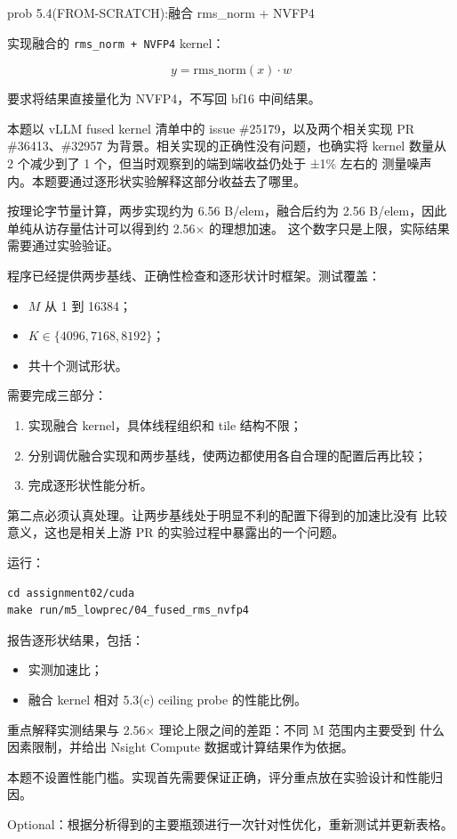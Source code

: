 \documentclass[11pt,a4paper,fontset=fandol]{ctexart}
\providecommand{\tightlist}{\setlength{\itemsep}{0pt}\setlength{\parskip}{0pt}}
\begin{document}
\begin{capstone}{prob 5.4(FROM-SCRATCH):融合 rms\_norm + NVFP4}

实现融合的 \texttt{rms\_norm\ +\ NVFP4} kernel：

\[
y = \mathrm{rms\_norm}(x)\cdot w
\]

要求将结果直接量化为 NVFP4，不写回 bf16 中间结果。

本题以 vLLM fused kernel 清单中的 issue \#25179，以及两个相关实现 PR
\#36413、\#32957 为背景。相关实现的正确性没有问题，也确实将 kernel
数量从 2 个减少到了 1 个，但当时观察到的端到端收益仍处于 ±1\% 左右的
测量噪声内。本题要通过逐形状实验解释这部分收益去了哪里。

按理论字节量计算，两步实现约为 6.56 B/elem，融合后约为 2.56
B/elem，因此单纯从访存量估计可以得到约 2.56× 的理想加速。
这个数字只是上限，实际结果需要通过实验验证。

程序已经提供两步基线、正确性检查和逐形状计时框架。测试覆盖：

\begin{itemize}
\tightlist
\item
  \(M\) 从 1 到 16384；
\item
  \(K \in \{4096, 7168, 8192\}\)；
\item
  共十个测试形状。
\end{itemize}

需要完成三部分：

\begin{enumerate}
\def\labelenumi{\arabic{enumi}.}
\tightlist
\item
  实现融合 kernel，具体线程组织和 tile 结构不限；
\item
  分别调优融合实现和两步基线，使两边都使用各自合理的配置后再比较；
\item
  完成逐形状性能分析。
\end{enumerate}

第二点必须认真处理。让两步基线处于明显不利的配置下得到的加速比没有
比较意义，这也是相关上游 PR 的实验过程中暴露出的一个问题。

运行：

\begin{verbatim}
cd assignment02/cuda
make run/m5_lowprec/04_fused_rms_nvfp4
\end{verbatim}

报告逐形状结果，包括：

\begin{itemize}
\tightlist
\item
  实测加速比；
\item
  融合 kernel 相对 5.3(c) ceiling probe 的性能比例。
\end{itemize}

重点解释实测结果与 2.56× 理论上限之间的差距：不同 M 范围内主要受到
什么因素限制，并给出 Nsight Compute 数据或计算结果作为依据。

本题不设置性能门槛。实现首先需要保证正确，评分重点放在实验设计和性能归因。

Optional：根据分析得到的主要瓶颈进行一次针对性优化，重新测试并更新表格。

\end{capstone}
\end{document}

